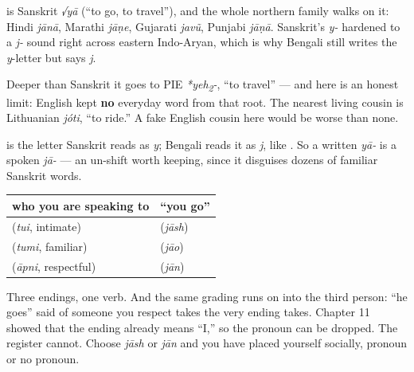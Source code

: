 \begin{cousinweb}
\textbf{} is Sanskrit \emph{√yā} (\textquotedblleft{}to go, to travel\textquotedblright{}), and the whole northern family walks on it: Hindi \emph{jānā}, Marathi \emph{jāṇe}, Gujarati \emph{javũ}, Punjabi \emph{jāṇā}. Sanskrit's \emph{y-} hardened to a \emph{j-} sound right across eastern Indo-Aryan, which is why Bengali still writes the \emph{y}-letter \textbf{} but says \emph{j}.

Deeper than Sanskrit it goes to PIE \emph{*yeh\textsubscript{2}-}, \textquotedblleft{}to travel\textquotedblright{} — and here is an honest limit: English kept \textbf{no} everyday word from that root. The nearest living cousin is Lithuanian \emph{jóti}, \textquotedblleft{}to ride.\textquotedblright{} A fake English cousin here would be worse than none.
\end{cousinweb}

\begin{sounds}
\textbf{} is the letter Sanskrit reads as \emph{y}; Bengali reads it as \emph{j}, like \textbf{}. So a written \emph{yā-} is a spoken \emph{jā-} — an un-shift worth keeping, since it disguises dozens of familiar Sanskrit words.
\end{sounds}

\begin{grammarlens}[title={Grammar Lens: the respect is not in the pronoun, it is in the ending}]
\noindent
\begin{tabularx}{\linewidth}{@{}>{\raggedright\arraybackslash}X>{\raggedright\arraybackslash}X@{}}
\toprule
\textbf{who you are speaking to} & \textbf{\textquotedblleft{}you go\textquotedblright{}} \\
\midrule
\bn{তুই} (\emph{tui}, intimate) & \bn{যাস} (\emph{jāsh}) \\
\bn{তুমি} (\emph{tumi}, familiar) & \bn{যাও} (\emph{jāo}) \\
\bn{আপনি} (\emph{āpni}, respectful) & \bn{যান} (\emph{jān}) \\
\bottomrule
\end{tabularx}

Three endings, one verb. And the same grading runs on into the third person: \textquotedblleft{}he goes\textquotedblright{} said of someone you respect takes the very ending  takes. Chapter 11 showed that the ending already means \textquotedblleft{}I,\textquotedblright{} so the pronoun can be dropped. The register cannot. Choose \emph{jāsh} or \emph{jān} and you have placed yourself socially, pronoun or no pronoun.
\end{grammarlens}

